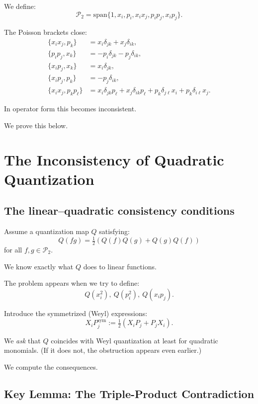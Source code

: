 \documentclass[12pt,oneside]{book}
\theoremstyle{plain}
\theoremstyle{definition}
\begin{document}
We define:
\[
\mathcal{P}_2 = \mathrm{span}\{1,x_i,p_i,x_ix_j,p_ip_j,x_ip_j\}.
\]

The Poisson brackets close:
\begin{align*}
\{x_i x_j, p_k\} &= x_i \delta_{jk} + x_j \delta_{ik},\\[4pt]
\{p_i p_j, x_k\} &= -p_i \delta_{jk} - p_j \delta_{ik},\\[4pt]
\{x_i p_j, x_k\} &= x_i\delta_{jk},\\[4pt]
\{x_i p_j, p_k\} &= -p_j \delta_{ik},\\[4pt]
\{x_i x_j, p_k p_\ell\} &= x_i \delta_{jk}p_\ell + x_j\delta_{ik}p_\ell
    + p_k \delta_{j\ell}x_i + p_k\delta_{i\ell}x_j.
\end{align*}

In operator form this becomes inconsistent.

We prove this below.

\section{The Inconsistency of Quadratic Quantization}

\subsection{The linear–quadratic consistency conditions}

Assume a quantization map $Q$ satisfying:
\[
Q(fg)=\tfrac12(Q(f)Q(g)+Q(g)Q(f))
\tag{2.1}
\label{symm}
\]
for all $f,g\in\mathcal{P}_2$.

We know exactly what $Q$ does to linear functions.

The problem appears when we try to define:
\[
Q(x_i^2),\ Q(p_i^2),\ Q(x_i p_j).
\]

Introduce the symmetrized (Weyl) expressions:
\[
X_i P_j^{\text{sym}} := \tfrac12(X_i P_j + P_j X_i).
\]

We \emph{ask} that $Q$ coincides with Weyl quantization at least for quadratic monomials.
(If it does not, the obstruction appears even earlier.)

We compute the consequences.

\subsection{Key Lemma: The Triple-Product Contradiction}
\end{document}
